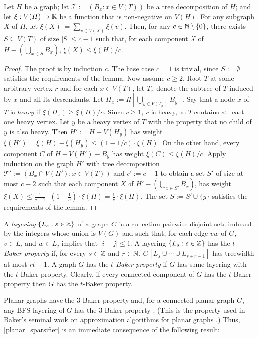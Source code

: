 \documentclass{patmorin}
\renewcommand{\ge}{\geqslant}
\renewcommand{\le}{\leqslant}
\newcommand{\defin}[1]{\emph{\textcolor{brightmaroon}{#1}}}
\begin{document}
\begin{lem}\label{weighted_separator}
    Let $H$ be a graph; let $\mathcal{T}:=(B_x:x\in V(T))$ be a tree decomposition of $H$; and let $\xi:V(H)\to\mathbb{R}$ be a function that is non-negative on $V(H)$.  For any subgraph $X$ of $H$, let  $\xi(X):=\sum_{v\in V(X)} \xi(v)$.
    Then, for any $c\in\mathbb{N}\setminus\{0\}$, there exists $S\subseteq V(T)$ of size $|S|\le c-1$ such that, for each component $X$ of $H-(\bigcup_{x\in S} B_x)$, $\xi(X)\le \xi(H)/c$.
\end{lem}

\begin{proof}
  The proof is by induction $c$.  The base case $c=1$ is trivial, since $S:=\emptyset$ satisfies the requirements of the lemma.  Now assume $c\ge 2$.  Root $T$ at some arbitrary vertex $r$ and for each $x\in V(T)$, let $T_x$ denote the subtree of $T$ induced by $x$ and all its descendants.  Let $H_x:=H[\bigcup_{y\in V(T_x)} B_y]$.  Say that a node $x$ of $T$ is \defin{heavy} if $\xi(H_x) \ge \xi(H)/c$. Since $c\ge 1$, $r$ is heavy, so $T$ contains at least one heavy vertex. Let $y$ be a heavy vertex of $T$ with the property that no child of $y$ is also heavy.  Then $H':=H-V(H_y)$ has weight $\xi(H') = \xi(H)-\xi(H_y) \le (1-1/c)\cdot\xi(H)$.  On the other hand, every component $C$ of $H-V(H')-B_y$ has weight $\xi(C) \le \xi(H)/c$.  Apply induction on the graph $H'$ with tree decomposition $\mathcal{T}':=(B_x\cap V(H'):x\in V(T))$ and $c':=c-1$ to obtain a set $S'$ of size at most $c-2$ such that each component $X$ of $H'-(\bigcup_{x\in S'} B_x)$, has weight $\xi(X) \le \tfrac{1}{c-1}\cdot(1-\tfrac{1}{c})\cdot\xi(H) = \tfrac{1}{c}\cdot \xi(H)$.  The set $S:=S'\cup\{y\}$ satisfies the requirements of the lemma.
\end{proof}

A \defin{layering} $\{L_s:s\in\mathbb{Z}\}$ of a graph $G$ is a collection pairwise disjoint sets indexed by the integers whose union is $V(G)$ and such that, for each edge $vw$ of $G$, $v\in L_i$ and $w\in L_j$ implies that $|i-j|\le 1$.
A layering $\{L_s:s\in\mathbb{Z}\}$ has the \defin{$t$-Baker property} if, for every $s\in\mathbb{Z}$ and $r\in\mathbb{N}$, $G[L_s\cup\cdots\cup L_{s+r-1}]$ has treewidth at most $rt-1$. A graph $G$ has the \defin{$t$-Baker property} if $G$ has some layering with the $t$-Baker property.  Clearly, if every connected component of $G$ has the $t$-Baker property then $G$ has the $t$-Baker property.

Planar graphs have the $3$-Baker property and, for a connected planar graph $G$, any BFS layering of $G$ has the $3$-Baker property \cite{RS-III}. (This is the property used in Baker's seminal work on approximation algorithms for planar graphs \cite{baker:approximation}.) Thus, \cref{planar_sparsifier} is an immediate consequence of the following result:
\end{document}
